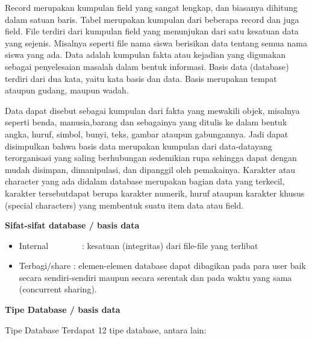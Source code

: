 \vspace{12pt}
Record merupakan kumpulan field yang sangat lengkap, dan biasanya dihitung dalam satuan baris. Tabel merupakan kumpulan dari beberapa record dan juga field. File terdiri dari kumpulan field yang menunjukan dari satu kesatuan data yang sejenis. Misalnya seperti file nama siswa berisikan data tentang semua nama siswa yang ada. Data adalah kumpulan fakta atau kejadian yang digunakan sebagai penyelesaian masalah dalam bentuk informasi. Basis data (database) terdiri dari dua kata, yaitu kata basis dan data. Basis merupakan tempat ataupun gudang, maupun wadah. \par
Data dapat disebut sebagai kumpulan dari fakta yang mewakili objek, misalnya seperti benda, manusia,barang dan sebagainya yang ditulis ke dalam bentuk angka, huruf, simbol, bunyi, teks, gambar ataupun gabungannya. Jadi dapat disimpulkan bahwa basis data merupakan kumpulan dari data-datayang terorganisasi yang saling berhubungan sedemikian rupa sehingga dapat dengan mudah disimpan, dimanipulasi, dan dipanggil oleh pemakainya. Karakter atau character yang ada didalam database merupakan bagian data yang terkecil, karakter tersebutdapat berupa karakter numerik, huruf ataupun karakter khusus (special characters) yang membentuk suatu item data atau field. \par
\vspace{12pt}
\noindent 
\textbf{Sifat-sifat database / basis data} \par
\noindent 
\begin{itemize}
\item Internal~~~~~~~~:  kesatuan (integritas) dari file-file yang terlibat \par
\noindent 
\item Terbagi/share : elemen-elemen database dapat dibagikan pada para user baik secara sendiri-sendiri maupun secara serentak dan pada waktu yang sama (concurrent sharing).\end{itemize}
 \par
\vspace{12pt}
\noindent 
\textbf{Tipe Database / basis data} \par
\noindent 
Tipe Database Terdapat 12 tipe database, antara lain: \par
\noindent 
